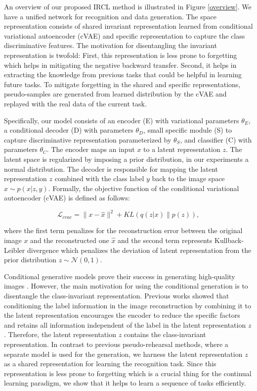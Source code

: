 \documentclass[letterpaper]{article} %
\begin{document}
An overview of our proposed IRCL method is illustrated in Figure \ref{overview}. We have a unified network for recognition and data generation. The space representation consists of shared invariant representation learned from conditional variational autoencoder (cVAE) and specific representation to capture the class discriminative features. The motivation for disentangling the invariant representation is twofold: First, this representation is less prone to forgetting which helps in mitigating the negative backward transfer. Second, it helps in extracting the knowledge from previous tasks that could be helpful in learning future tasks. To mitigate forgetting in the shared and specific representations, pseudo-samples are generated from learned distribution by the cVAE and replayed with the real data of the current task.

Specifically, our model consists of an encoder (E) with variational parameters $\theta_{E}$, a conditional decoder (D) with parameters $\theta_{D}$, small specific module (S) to capture discriminative representation parameterized by $\theta_{S}$, and classifier (C) with parameters $\theta_{C}$. The encoder maps an input $x$ to a latent representation $z$. The latent space is regularized by imposing a prior distribution, in our experiments a normal
distribution. The decoder is responsible for mapping the latent representation $z$ combined with the class label $y$ back to the image space $\hat{x} \sim p(x|z,y)$. Formally, the objective function of the conditional variational autoencoder (cVAE) is defined as follows:

\begin{equation}
\mathcal{L}_{cvae} = \|x- \hat{x}\|^{2} + KL(q(z|x)\|p(z)),
\label{vaeLoss}
\end{equation}

where the first term penalizes for the reconstruction error between the original image $x$ and the reconstructed one $\hat{x}$ and the second term represents Kullback-Leibler divergence which penalizes the deviation of latent representation from the prior distribution  $z \sim \mathcal{N}(0,1)$.

Conditional generative models prove their success in generating high-quality images \cite{miyato2018cgans,odena2017conditional}. However, the main motivation for using the conditional generation is to disentangle the class-invariant representation. Previous works \cite{makhzani2015adversarial,chen2020cyclically} showed that conditioning the label information in the image reconstruction by combining it to the latent representation encourages the encoder to reduce the specific factors and retains all information independent of the label in the latent representation $z$. Therefore, the latent representation $z$ contains the class-invariant representation. In contrast to previous pseudo-rehearsal methods, where a separate model is used for the generation, we harness the latent representation $z$ as a shared representation for learning the recognition task. Since this representation is less prone to forgetting which is a crucial thing for the continual learning paradigm, we show that it helps to learn a sequence of tasks efficiently.
\end{document}
